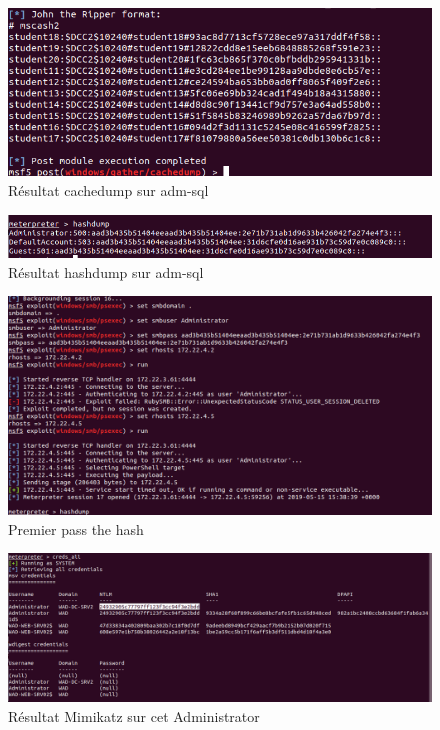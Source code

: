 \documentclass[12pt]{report} %
\begin{document}
\begin{figure}[!h]
	\includegraphics[width=17cm]{cachedump_server_5_3-5.PNG}
	\caption*{Résultat cachedump sur adm-sql}
\end{figure}

\begin{figure}[!h]
	\includegraphics[width=17cm]{hashdump_sql_server3-5.PNG}
	\caption*{Résultat hashdump sur adm-sql}
\end{figure}

\begin{figure}[!h]
	\includegraphics[width=17cm]{pass_the_hash_first_3-5.PNG}
	\caption*{Premier pass the hash}
\end{figure}

\begin{figure}[!h]
	\includegraphics[width=17cm]{creds_all_server5_3-5.PNG}
	\caption*{Résultat Mimikatz sur cet Administrator}
\end{figure}
\end{document}
